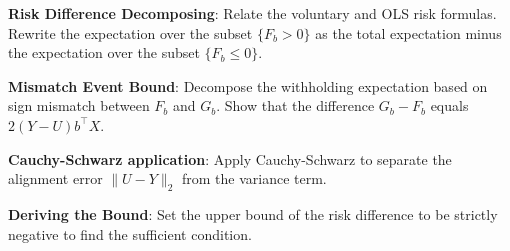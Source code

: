 \begin{guideblock}
\item \textbf{Risk Difference Decomposing}: Relate the voluntary and OLS risk formulas. Rewrite the expectation over the subset $\{F_b > 0\}$ as the total expectation minus the expectation over the subset $\{F_b \le 0\}$.
\item \textbf{Mismatch Event Bound}: Decompose the withholding expectation based on sign mismatch between $F_b$ and $G_b$. Show that the difference $G_b - F_b$ equals $2(Y-U)b^\top X$.
\item \textbf{Cauchy-Schwarz application}: Apply Cauchy-Schwarz to separate the alignment error $\|U - Y\|_2$ from the variance term.
\item \textbf{Deriving the Bound}: Set the upper bound of the risk difference to be strictly negative to find the sufficient condition.
\end{guideblock}


